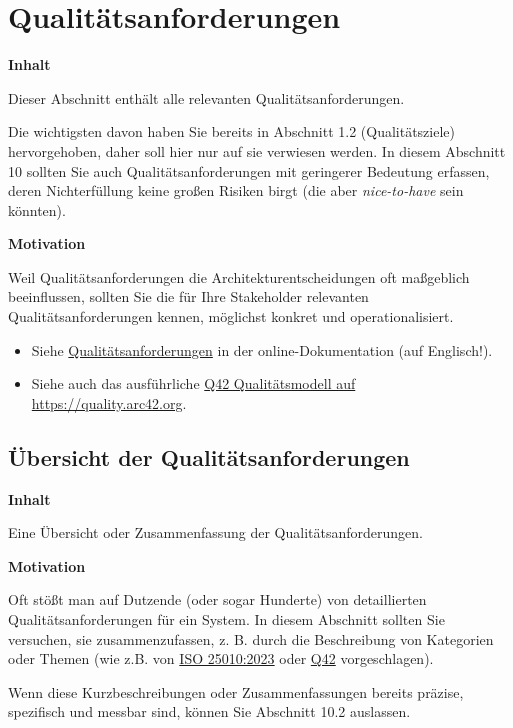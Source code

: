 \documentclass[a4paper,12pt]{article}
\begin{document}
\section{Qualitätsanforderungen}\label{section-quality-scenarios}

\textbf{Inhalt}

Dieser Abschnitt enthält alle relevanten Qualitätsanforderungen.

Die wichtigsten davon haben Sie bereits in Abschnitt 1.2
(Qualitätsziele) hervorgehoben, daher soll hier nur auf sie verwiesen
werden. In diesem Abschnitt 10 sollten Sie auch Qualitätsanforderungen
mit geringerer Bedeutung erfassen, deren Nichterfüllung keine großen
Risiken birgt (die aber \emph{nice-to-have} sein könnten).

\textbf{Motivation}

Weil Qualitätsanforderungen die Architekturentscheidungen oft maßgeblich
beeinflussen, sollten Sie die für Ihre Stakeholder relevanten
Qualitätsanforderungen kennen, möglichst konkret und operationalisiert.

\begin{itemize}
\item
  Siehe
  \href{https://docs.arc42.org/section-10/}{Qualitätsanforderungen} in
  der online-Dokumentation (auf Englisch!).
\item
  Siehe auch das ausführliche \href{https://quality.arc42.org}{Q42
  Qualitätsmodell auf https://quality.arc42.org}.
\end{itemize}

\subsection{Übersicht der
Qualitätsanforderungen}\label{_uxfcbersicht_der_qualituxe4tsanforderungen}

\textbf{Inhalt}

Eine Übersicht oder Zusammenfassung der Qualitätsanforderungen.

\textbf{Motivation}

Oft stößt man auf Dutzende (oder sogar Hunderte) von detaillierten
Qualitätsanforderungen für ein System. In diesem Abschnitt sollten Sie
versuchen, sie zusammenzufassen, z. B. durch die Beschreibung von
Kategorien oder Themen (wie z.B. von
\href{https://www.iso.org/obp/ui/\#iso:std:iso-iec:25010:ed-2:v1:en}{ISO
25010:2023} oder \href{https://quality.arc42.org}{Q42} vorgeschlagen).

Wenn diese Kurzbeschreibungen oder Zusammenfassungen bereits präzise,
spezifisch und messbar sind, können Sie Abschnitt 10.2 auslassen.
\end{document}

